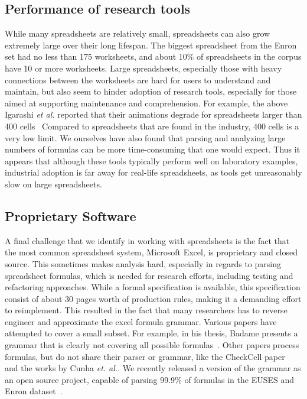 \documentclass[conference]{IEEEtran}
\begin{document}
\subsection{Performance of research tools}

While many spreadsheets are relatively small, spreadsheets can also grow extremely large over their long lifespan. The biggest spreadsheet from the Enron set had no less than 175 worksheets, and about 10\% of spreadsheets in the corpus have 10 or more worksheets. Large spreadsheets, especially those with heavy connections between the worksheets are hard for users to understand and maintain, but also seem to hinder adoption of research tools, especially for those aimed at supporting maintenance and comprehension. For example, the above Igarashi \emph{et al.} reported that their animations degrade for spreadsheets larger than 400 cells~\cite{igarashi1998fluid} Compared to spreadsheets that are found in the industry, 400 cells is a very low limit. We ourselves have also found that parsing and analyzing large numbers of formulas can be more time-consuming that one would expect. Thus it appears that although these tools typically perform well on laboratory examples, industrial adoption is far away for real-life spreadsheets, as tools get unreasonably slow on large spreadsheets.


\subsection{Proprietary Software} 
A final challenge that we identify in working with spreadsheets is the fact that the most common spreadsheet system, Microsoft Excel, is proprietary and closed source. This sometimes makes analysis hard, especially in regards to parsing spreadsheet formulas, which is needed for research efforts, including testing and refactoring approaches. While a formal specification is available, this specification consist of about 30 pages worth of production rules, making it a demanding effort to reimplement. This resulted in the fact that many researchers has to reverse engineer and approximate the excel formula grammar.  Various papers have attempted to cover a small subset. For example, in his thesis, Badame presents a grammar that is clearly not covering all possible formulas~\cite{badame_thesis_2012}. Other papers process formulas, but do not share their parser or grammar, like the CheckCell paper~\cite{barowy_checkcell:_2014} and the works by Cunha \emph{et. al.}\cite{cunha_automatically_2010, cunha_towards_2012}. We recently released a version of the grammar as an open source project, capable of parsing 99.9\% of formulas in the EUSES and Enron dataset~\cite{Aivaloglou_2015}.
\end{document}
